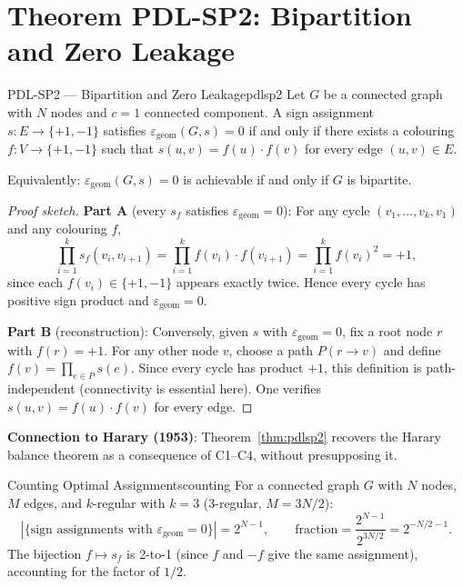 \documentclass[12pt,a4paper]{article}
\newcommand{\epsgeom}{\varepsilon_{\mathrm{geom}}}
\begin{document}
\section{Theorem PDL-SP2: Bipartition and Zero Leakage}
\label{sec:theorem}

\begin{theorem}{PDL-SP2 — Bipartition and Zero Leakage}{pdlsp2}
Let $G$ be a connected graph with $N$ nodes and $c = 1$ connected
component. A sign assignment $s: E \to \{+1,-1\}$ satisfies
$\epsgeom(G,s) = 0$ if and only if there exists a colouring
$f: V \to \{+1,-1\}$ such that $s(u,v) = f(u)\cdot f(v)$
for every edge $(u,v) \in E$.

Equivalently: $\epsgeom(G,s) = 0$ is achievable if and only if
$G$ is bipartite.
\end{theorem}

\begin{proof}[Proof sketch]
\textbf{Part A} (every $s_f$ satisfies $\epsgeom = 0$): For any cycle
$(v_1,\ldots,v_k,v_1)$ and any colouring $f$,
\[
  \prod_{i=1}^{k} s_f(v_i,v_{i+1})
  = \prod_{i=1}^{k} f(v_i)\cdot f(v_{i+1})
  = \prod_{i=1}^{k} f(v_i)^2 = +1,
\]
since each $f(v_i) \in \{+1,-1\}$ appears exactly twice. Hence every
cycle has positive sign product and $\epsgeom = 0$.

\textbf{Part B} (reconstruction): Conversely, given $s$ with
$\epsgeom = 0$, fix a root node $r$ with $f(r) = +1$. For any
other node $v$, choose a path $P(r \to v)$ and define
$f(v) = \prod_{e \in P} s(e)$. Since every cycle has product $+1$,
this definition is path-independent (connectivity is essential here).
One verifies $s(u,v) = f(u)\cdot f(v)$ for every edge.
\end{proof}

\textbf{Connection to Harary (1953)}: Theorem~\ref{thm:pdlsp2} recovers
the Harary balance theorem \cite{Harary1953} as a consequence of C1--C4,
without presupposing it.

\begin{theorem}{Counting Optimal Assignments}{counting}
For a connected graph $G$ with $N$ nodes, $M$ edges, and $k$-regular
with $k=3$ (3-regular, $M = 3N/2$):
\[
  |\{\text{sign assignments with } \epsgeom = 0\}|
  = 2^{N-1}, \qquad
  \text{fraction} = \frac{2^{N-1}}{2^{3N/2}} = 2^{-N/2-1}.
\]
The bijection $f \mapsto s_f$ is 2-to-1 (since $f$ and $-f$ give
the same assignment), accounting for the factor of $1/2$.
\end{theorem}
\end{document}
